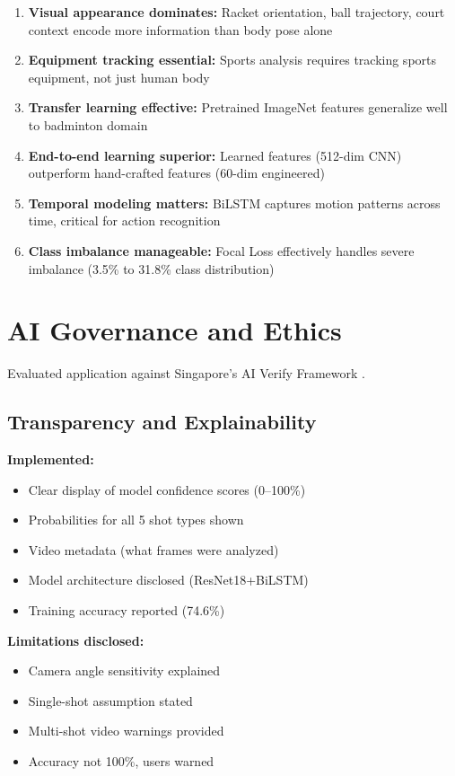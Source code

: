 \documentclass[12pt,a4paper]{article}
\begin{document}
\begin{enumerate}
\item \textbf{Visual appearance dominates:} Racket orientation, ball trajectory, court context encode more information than body pose alone

\item \textbf{Equipment tracking essential:} Sports analysis requires tracking sports equipment, not just human body

\item \textbf{Transfer learning effective:} Pretrained ImageNet features generalize well to badminton domain

\item \textbf{End-to-end learning superior:} Learned features (512-dim CNN) outperform hand-crafted features (60-dim engineered)

\item \textbf{Temporal modeling matters:} BiLSTM captures motion patterns across time, critical for action recognition

\item \textbf{Class imbalance manageable:} Focal Loss effectively handles severe imbalance (3.5\% to 31.8\% class distribution)
\end{enumerate}

\section{AI Governance and Ethics}

Evaluated application against Singapore's AI Verify Framework \cite{AIVerify}.

\subsection{Transparency and Explainability}

\textbf{Implemented:}
\begin{itemize}
\item Clear display of model confidence scores (0--100\%)
\item Probabilities for all 5 shot types shown
\item Video metadata (what frames were analyzed)
\item Model architecture disclosed (ResNet18+BiLSTM)
\item Training accuracy reported (74.6\%)
\end{itemize}

\textbf{Limitations disclosed:}
\begin{itemize}
\item Camera angle sensitivity explained
\item Single-shot assumption stated
\item Multi-shot video warnings provided
\item Accuracy not 100\%, users warned
\end{itemize}
\end{document}
